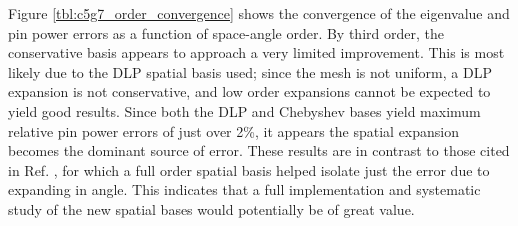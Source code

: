 Figure \ref{tbl:c5g7_order_convergence} shows the convergence of 
the eigenvalue and pin power errors as a function of space-angle 
order.  By third order, the conservative basis appears to approach 
a very limited improvement.  This is most likely due to the DLP 
spatial basis used; since the mesh is not uniform, a DLP expansion is 
not conservative, and low order expansions cannot be expected to 
yield good results.  Since both the DLP and Chebyshev bases yield 
maximum relative pin power errors of just over 2\%, it appears 
the spatial expansion becomes the dominant source of error.  These 
results are in contrast to those cited in Ref. \cite{roberts2014psb}, 
for which a full order spatial basis helped isolate just the 
error due to expanding in angle.  This indicates that a full 
implementation and systematic study of the new spatial bases 
would potentially be of great value.


